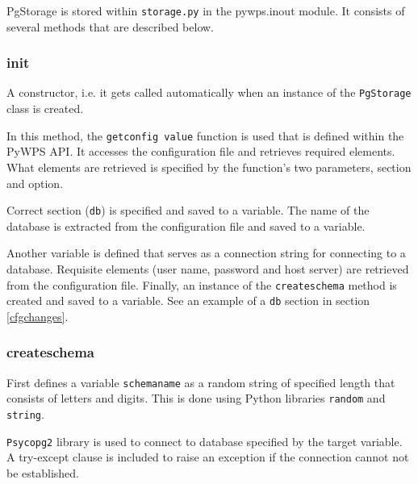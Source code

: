 PgStorage is stored within \texttt{storage.py} in the pywps.inout
module. It consists of several methods that are described below.

\subsubsection{\textunderscore \textunderscore init\textunderscore \textunderscore } 
A constructor, i.e. it gets called automatically when an instance of
the \texttt{PgStorage} class is created.

In this method, the \texttt{get\textunderscore config\textunderscore
  value} function is used that is defined within the PyWPS API. It
accesses the configuration file and retrieves required elements. What
elements are retrieved is specified by the function's two parameters,
section and option.

Correct section (\texttt{db}) is specified and saved to a
variable. The name of the database is extracted from the
configuration file and saved to a variable.

Another variable is defined that serves as a connection string for
connecting to a database. Requisite elements (user name, password and
host server) are retrieved from the configuration file. Finally, an
instance of the \texttt{\textunderscore create\textunderscore schema}
method is created and saved to a variable. See an example of a \texttt{db}
section in section \ref{cfgchanges}.


\subsubsection{\textunderscore create\textunderscore schema} 

First defines a variable \texttt{schema\textunderscore name} as a
random string of specified length that consists of letters and
digits. This is done using Python libraries \texttt{random} and
\texttt{string}.
 
\texttt{Psycopg2} library is used to connect to database
specified by the target variable. A try-except clause is included to raise
an exception if the connection cannot not be established.

